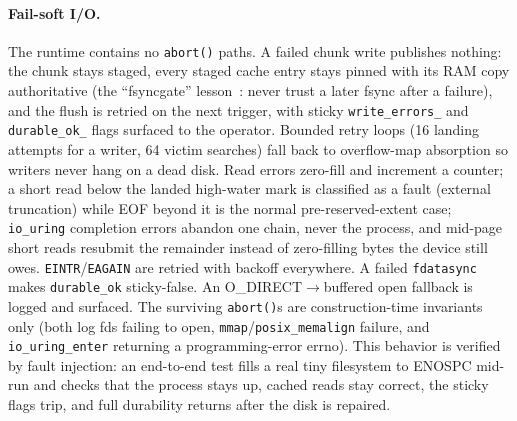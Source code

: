 \documentclass{article}
\begin{document}
\paragraph{Fail-soft I/O.}
The runtime contains no \texttt{abort()} paths. A failed chunk write publishes nothing: the chunk stays staged, every staged cache entry stays pinned with its RAM copy authoritative (the ``fsyncgate'' lesson~\cite{fsyncfail}: never trust a later fsync after a failure), and the flush is retried on the next trigger, with sticky \texttt{write\_errors\_} and \texttt{durable\_ok\_} flags surfaced to the operator. Bounded retry loops (16 landing attempts for a writer, 64 victim searches) fall back to overflow-map absorption so writers never hang on a dead disk. Read errors zero-fill and increment a counter; a short read below the landed high-water mark is classified as a fault (external truncation) while EOF beyond it is the normal pre-reserved-extent case; \texttt{io\_uring} completion errors abandon one chain, never the process, and mid-page short reads resubmit the remainder instead of zero-filling bytes the device still owes. \texttt{EINTR}/\texttt{EAGAIN} are retried with backoff everywhere. A failed \texttt{fdatasync} makes \texttt{durable\_ok} sticky-false. An O\_DIRECT$\to$buffered open fallback is logged and surfaced. The surviving \texttt{abort()}s are construction-time invariants only (both log fds failing to open, \texttt{mmap}/\texttt{posix\_memalign} failure, and \texttt{io\_uring\_enter} returning a programming-error errno). This behavior is verified by fault injection: an end-to-end test fills a real tiny filesystem to ENOSPC mid-run and checks that the process stays up, cached reads stay correct, the sticky flags trip, and full durability returns after the disk is repaired.
\end{document}

